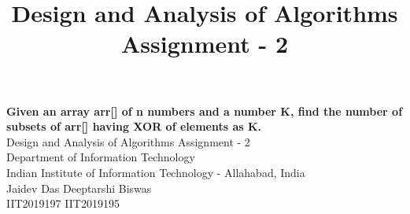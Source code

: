 \documentclass[10pt]{article}
\author{}
\title{\Large{Design and Analysis of Algorithms Assignment - 2}}
\begin{document}
	\begin{center}
		{\Large \textbf{Given an array arr[] of n numbers and a number K, find the number of subsets of arr[] having XOR of elements as K.}}\\
			\vspace{1em}
		{\large Design and Analysis of Algorithms Assignment - 2 }\\
		\vspace{1em}
		{\large Department of Information Technology}\\
		\vspace{1em}
		\large{Indian Institute of Information Technology - Allahabad, India}\\
		\vspace{1em}
		\large{Jaidev Das \hspace{7em} Deeptarshi Biswas }\\
		\large{IIT2019197 \hspace{10em} IIT2019195} 
		
		\vspace{2.5em}
	\end{center}
	
\end{document}
